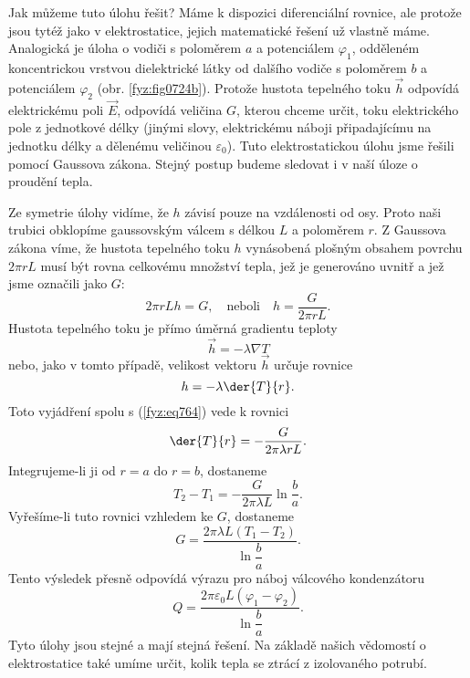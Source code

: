     Jak můžeme tuto úlohu řešit? Máme k dispozici diferenciální rovnice, ale protože jsou tytéž jako
    v elektrostatice, jejich matematické řešení už vlastně máme. Analogická je úloha o vodiči s
    poloměrem \(a\) a potenciálem \(\varphi_1\), odděleném koncentrickou vrstvou dielektrické látky
    od dalšího vodiče s poloměrem \(b\) a potenciálem \(\varphi_2\) (obr. \ref{fyz:fig0724b}).
    Protože hustota tepelného toku \(\vec{h}\) odpovídá elektrickému poli \(\vec{E}\), odpovídá
    veličina \(G\), kterou chceme určit, toku elektrického pole z jednotkové délky (jinými slovy,
    elektrickému náboji připadajícímu na jednotku délky a dělenému veličinou \(\varepsilon_0\)).
    Tuto elektrostatickou úlohu jsme řešili pomocí Gaussova zákona. Stejný postup budeme sledovat i
    v naší úloze o proudění tepla.

    Ze symetrie úlohy vidíme, že \(h\) závisí pouze na vzdálenosti od osy. Proto naši trubici
    obklopíme gaussovským válcem s délkou \(L\) a poloměrem \(r\). Z Gaussova zákona víme, že
    hustota tepelného toku \(h\) vynásobená plošným obsahem povrchu \(2\pi rL\) musí být rovna
    celkovému množství tepla, jež je generováno uvnitř a jež jsme označili jako \(G\):
    \begin{equation}\label{fyz:eq764}
      2\pi rLh= G, \quad \text{neboli}\quad h = \dfrac{G}{ 2\pi rL}.
    \end{equation}
    Hustota tepelného toku je přímo úměrná gradientu teploty
    \begin{equation*}
      \vec{h} = -\lambda\nabla T
    \end{equation*}
    nebo, jako v tomto případě, velikost vektoru \(\vec{h}\) určuje rovnice
    \begin{equation*}
      h = -\lambda\der{T}{r}.
    \end{equation*}
    Toto vyjádření spolu s (\ref{fyz:eq764}) vede k rovnici
    \begin{equation}\label{fyz:eq765}
       \der{T}{r} = -\dfrac{G}{2\pi\lambda rL}.
    \end{equation}
    Integrujeme-li ji od \(r=a\) do \(r=b\), dostaneme
    \begin{equation}\label{fyz:eq766}
      T_2 - T_1 = -\dfrac{G}{2\pi\lambda L}\ln\dfrac{b}{a}.
    \end{equation}
    Vyřešíme-li tuto rovnici vzhledem ke \(G\), dostaneme
    \begin{equation}\label{fyz:eq767}
      G = \dfrac{2\pi\lambda L(T_1 - T_2)}{\ln\dfrac{b}{a}}.
    \end{equation}
    Tento výsledek přesně odpovídá výrazu pro náboj válcového kondenzátoru
    \begin{equation}\label{fyz:eq768}
      Q = \dfrac{2\pi\varepsilon_0 L(\varphi_1 - \varphi_2)}{\ln\dfrac{b}{a}}.
    \end{equation}
    Tyto úlohy jsou stejné a mají stejná řešení. Na základě našich vědomostí o elektrostatice také 
    umíme určit, kolik tepla se ztrácí z izolovaného potrubí.


